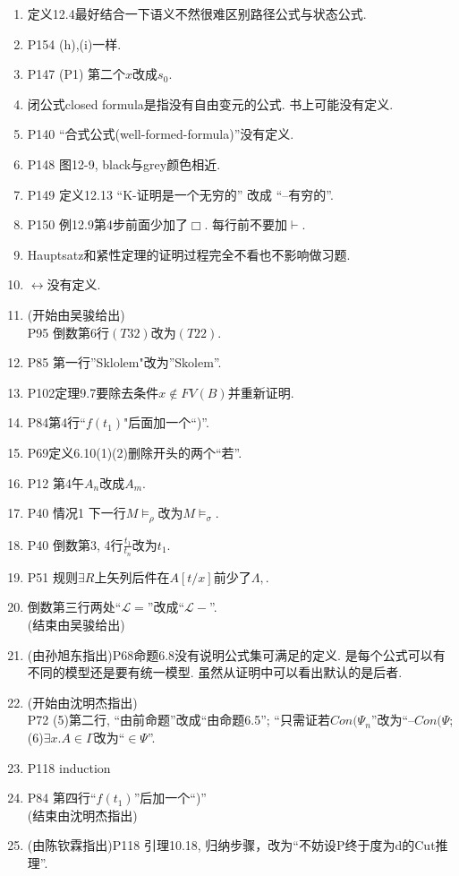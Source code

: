 \documentclass{article}
\begin{document}
\begin{enumerate}
\item 定义12.4最好结合一下语义不然很难区别路径公式与状态公式. 
\item P154 (h),(i)一样. 
\item P147 (P1) 第二个$x$改成$s_0$. 
\item 闭公式closed formula是指没有自由变元的公式. 书上可能没有定义. 
\item P140 ``合式公式(well-formed-formula)''没有定义. 
\item P148 图12-9, black与grey颜色相近. 
\item P149 定义12.13 ``K-证明是一个无穷的'' 改成 ``--有穷的''. 
\item P150 例12.9第4步前面少加了$\Box$. 每行前不要加$\vdash$. 

\item Hauptsatz和紧性定理的证明过程完全不看也不影响做习题. 

\item $\leftrightarrow$没有定义. 
\item (开始由吴骏给出)\\P95 倒数第6行$(T32)$改为$(T22)$. 
\item P85 第一行''Sklolem"改为''Skolem''. 
\item P102定理9.7要除去条件$x\notin FV(B)$并重新证明. 
\item P84第4行``$f(t_1)$"后面加一个``)''. 
\item P69定义6.10(1)(2)删除开头的两个``若''. 
\item P12 第4午$A_n$改成$A_m$. 
\item P40 情况1 下一行$M\models_\rho$改为$M\models_\sigma$. 
\item P40 倒数第3, 4行$\frac{t_1}{t_n}$改为$t_1$. 
\item P51 规则$\exists R$上矢列后件在$A[t/x]$前少了$\Lambda, $. 
\item 倒数第三行两处``$\mathscr{L}=$''改成``$\mathscr{L}-$''. \\
		(结束由吴骏给出)

\item (由孙旭东指出)P68命题6.8没有说明公式集可满足的定义. 是每个公式可以有不同的模型还是要有统一模型. 虽然从证明中可以看出默认的是后者. 

\item (开始由沈明杰指出)\\P72 (5)第二行, ``由前命题''改成``由命题6.5''; ``只需证若$Con(\Psi_n$''改为``--$Con(\Psi$; (6)$\exists x.A \in \Gamma$改为``$\in \Psi$''. 
\item P118 induction
\item P84 第四行``$f(t_1)$''后加一个``)''\\(结束由沈明杰指出)

\item (由陈钦霖指出)P118 引理10.18, 归纳步骤，改为``不妨设P终于度为d的Cut推理''. 

\end{enumerate}
\end{document}
